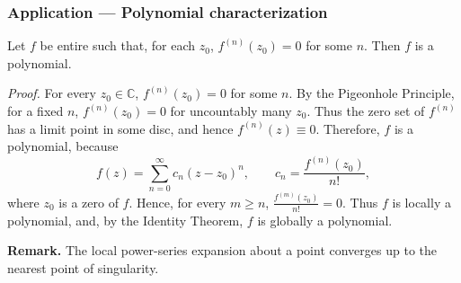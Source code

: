 \documentclass[11pt,a4paper]{article}
\begin{document}

\subsubsection*{Application — Polynomial characterization}
Let $f$ be entire such that, for each $z_0$,
$f^{(n)}(z_0)=0$ for some $n$. Then $f$ is a polynomial.

\textit{Proof.}
For every $z_0\in\mathbb C$, $f^{(n)}(z_0)=0$ for some $n$. By the
Pigeonhole Principle, for a fixed $n$, $f^{(n)}(z_0)=0$ for uncountably many
$z_0$. Thus the zero set of $f^{(n)}$ has a limit point in some disc, and
hence \(f^{(n)}(z)\equiv0.\)
Therefore, $f$ is a polynomial, because
\[
  f(z)=\sum_{n=0}^{\infty}c_n(z-z_0)^n,
  \qquad
  c_n=\frac{f^{(n)}(z_0)}{n!},
\]
where $z_0$ is a zero of $f$. Hence, for every $m\geq n$, \(\frac{f^{(m)}(z_0)}{n!}=0.\)
Thus $f$ is locally a polynomial, and, by the Identity Theorem, $f$ is globally
a polynomial.

\textbf{Remark.}
The local power-series expansion about a point converges up to the
nearest point of singularity.
\end{document}
